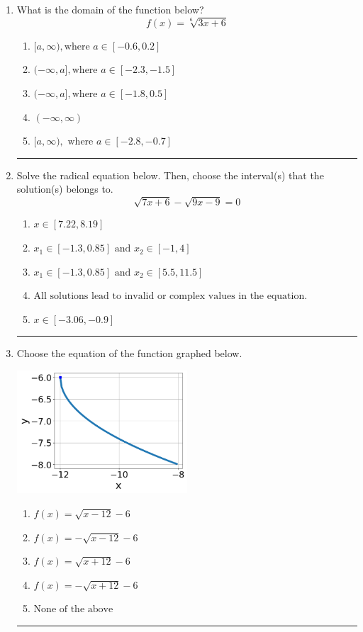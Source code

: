 \documentclass[14pt]{extbook}
\newcommand{\litem}[1]{\item#1\hspace*{-1cm}\rule{\textwidth}{0.4pt}}
\begin{document}
\begin{enumerate}
{\begin{enumerate}[label=\Alph*.]
\end{enumerate} }
\litem{
What is the domain of the function below?\[ f(x) = \sqrt[6]{3 x + 6} \]\begin{enumerate}[label=\Alph*.]
\item \( [a, \infty), \text{where } a \in [-0.6, 0.2] \)
\item \( (-\infty, a], \text{where } a \in [-2.3, -1.5] \)
\item \( (-\infty, a], \text{where } a \in [-1.8, 0.5] \)
\item \( (-\infty, \infty) \)
\item \( [a, \infty), \text{ where } a \in [-2.8, -0.7] \)

\end{enumerate} }
\litem{
Solve the radical equation below. Then, choose the interval(s) that the solution(s) belongs to.\[ \sqrt{7 x + 6} - \sqrt{9 x - 9} = 0 \]\begin{enumerate}[label=\Alph*.]
\item \( x \in [7.22,8.19] \)
\item \( x_1 \in [-1.3, 0.85] \text{ and } x_2 \in [-1,4] \)
\item \( x_1 \in [-1.3, 0.85] \text{ and } x_2 \in [5.5,11.5] \)
\item \( \text{All solutions lead to invalid or complex values in the equation.} \)
\item \( x \in [-3.06,-0.9] \)

\end{enumerate} }
\litem{
Choose the equation of the function graphed below.
\begin{center}
    \includegraphics[width=0.5\textwidth]{../Figures/radicalGraphToEquationCopyC.png}
\end{center}
\begin{enumerate}[label=\Alph*.]
\item \( f(x) = \sqrt{x - 12} - 6 \)
\item \( f(x) = - \sqrt{x - 12} - 6 \)
\item \( f(x) = \sqrt{x + 12} - 6 \)
\item \( f(x) = - \sqrt{x + 12} - 6 \)
\item \( \text{None of the above} \)


\end{enumerate}}
\end{enumerate}
\end{document}

